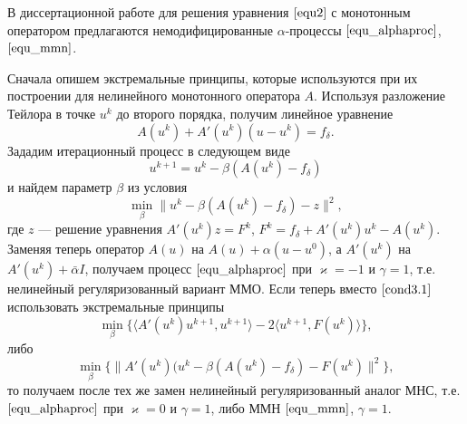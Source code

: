В диссертационной работе для решения уравнения $\eqref{equ2}$ с монотонным оператором предлагаются немодифицированные $\alpha$-процессы $\eqref{equ_alphaproc}$, $\eqref{equ_mmn}$.

Сначала опишем экстремальные принципы, которые используются при их  построении для нелинейного монотонного оператора $A$. Используя разложение Тейлора в точке $u^k$ до второго порядка, получим линейное уравнение
\begin{equation*}
A(u^k)+A'(u^k)(u-u^k)=f_{\delta}.
\end{equation*}
Зададим итерационный процесс в следующем виде
\begin{equation*}
u^{k+1}=u^k-\beta(A(u^k)-f_{\delta})
\end{equation*}
и найдем параметр $\beta$ из условия
\begin{equation}\label{cond3.1}
\min_{\beta}{\|u^k-\beta(A(u^k)-f_{\delta})-z\|^2},
\end{equation}
где $z$ --- решение уравнения $A'(u^k)z=F^k$, $F^k=f_{\delta}+A'(u^k)u^k-A(u^k)$. Заменяя теперь оператор $A(u)$ на $A(u)+\alpha(u-u^0)$, а $A'(u^k)$ на $A'(u^k)+\bar\alpha I$, получаем процесс $\eqref{equ_alphaproc}$ при $\varkappa=-1$ и $\gamma=1$, т.е. нелинейный регуляризованный вариант ММО. Если теперь вместо $\eqref{cond3.1}$ использовать экстремальные принципы
$$\min_{\beta}\{\langle A'(u^k)u^{k+1},u^{k+1}\rangle-2\langle u^{k+1},F(u^k)\rangle\},$$
либо 
\begin{equation}\label{cond3.2}
\min_{\beta}\{\|A'(u^k)(u^k-\beta(A(u^k)-f_{\delta})-F(u^k)\|^2\},
\end{equation}
то получаем после тех же замен нелинейный регуляризованный аналог МНС, т.е. $\eqref{equ_alphaproc}$ при $\varkappa=0$ и $\gamma=1$, либо ММН $\eqref{equ_mmn}$, $\gamma=1$.


